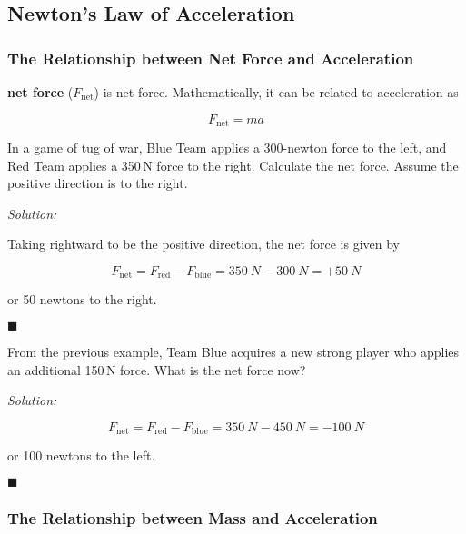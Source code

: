 \documentclass[dvipsnames]{article}
\begin{document}
\subsection{Newton's Law of Acceleration}

\subsubsection{The Relationship between Net Force and Acceleration}

\textbf{\Gls{net force}} ($F_\text{net}$) is \glsdesc{net force}. Mathematically, it can be related to acceleration as

\begin{equation*}
    F_\text{net} = ma
\end{equation*}


\begin{example}
In a game of tug of war, Blue Team applies a 300-newton force to the left, and Red Team applies a 350\,N force to the right. Calculate the net force. Assume the positive direction is to the right.
\end{example}

\textit{Solution:} 

Taking rightward to be the positive direction, the net force is given by

\begin{equation*}
    F_\mathrm{net} = F_\mathrm{red} - F_\mathrm{blue} = \SI{350}{N} - \SI{300}{N} = \boxed{+\SI{50}{N}}
\end{equation*}

or 50 newtons to the right.

\hfill $\blacksquare$


\begin{example}
From the previous example, Team Blue acquires a new strong player who applies an additional 150\,N force. What is the net force now?
\end{example}

\textit{Solution:}

\begin{equation*}
    F_\mathrm{net} = F_\mathrm{red} - F_\mathrm{blue} = \SI{350}{N} - \SI{450}{N} = \boxed{-\SI{100}{N}}
\end{equation*}

or 100 newtons to the left.

\hfill $\blacksquare$

\subsubsection{The Relationship between Mass and Acceleration}
\end{document}
